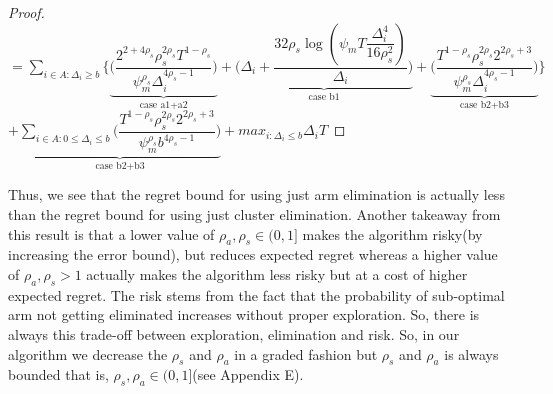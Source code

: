 \begin{proof}
\newline$= \sum\limits_{i\in A:\Delta_{i}\geq b}\bigg\lbrace\underbrace{\bigg(\dfrac{2^{2+4\rho_{s}}\rho_{s}^{2\rho_{s}}T^{1-\rho_{s}}}{\psi_{m}^{\rho_{s}}\Delta_{i}^{4\rho_{s}-1}}\bigg)}_{\text{case a1+a2}} + \underbrace{\bigg(\Delta_{i}+\dfrac{32\rho_{s}\log{(\psi_{m}T\dfrac{\Delta_{i}^{4}}{16\rho_{s}^{2}})}}{\Delta_{i}}\bigg)}_{\text{case b1}}  +  \underbrace{\bigg(\dfrac{T^{1-\rho_{s}}\rho_{s}^{2\rho_{s}}2^{2\rho_{s}+3}}{\psi_{m}^{\rho_{s}}\Delta_{i}^{4\rho_{s} -1}} \bigg)}_{\text{case b2+b3}}\bigg \rbrace$\newline$+\underbrace{\sum\limits_{i\in A:0\leq\Delta_{i}\leq b}\bigg(\dfrac{T^{1-\rho_{s}}\rho_{s}^{2\rho_{s}}2^{2\rho_{s}+3}}{\psi_{m}^{\rho_{s}}b^{4\rho_{s} -1}} \bigg)}_{\text{case b2+b3}} + max_{i:\Delta_{i}\leq b}\Delta_{i}T$
\end{proof}

\begin{remark}
\label{App:B:Rem:2}
Thus, we see that the regret bound for using just arm elimination is actually less than the regret bound for using just cluster elimination. Another takeaway from this result is that a lower value of $\rho_{a},\rho_{s}\in (0,1]$ makes the algorithm risky(by increasing the error bound), but reduces expected regret whereas a higher value of $\rho_{a},\rho_{s} > 1$ actually makes the algorithm less risky but at a cost of higher expected regret. The risk stems from the fact that the probability of sub-optimal arm not getting eliminated increases without proper exploration. So, there is always this trade-off between exploration, elimination and risk. So, in our algorithm we decrease the $\rho_{s}$ and $\rho_{a}$ in a graded fashion but $\rho_{s}$ and $\rho_{a}$ is always bounded that is, $\rho_{s},\rho_{a} \in (0,1]$(see Appendix E).
\end{remark}



